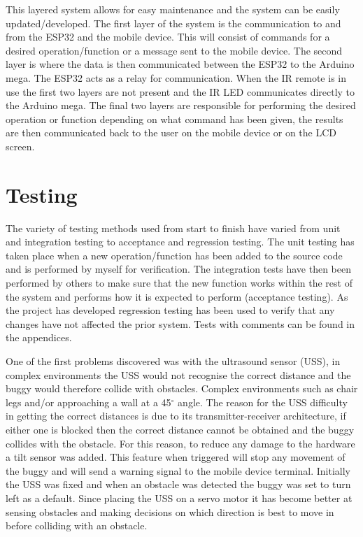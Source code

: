 \documentclass[8pt, a4paper]{article}
\begin{document}
This layered system allows for easy maintenance and the system can be easily updated/developed. The first layer of the system is the communication to and from the ESP32 and the mobile device. This will consist of commands for a desired operation/function or a message sent to the mobile device. The second layer is where the data is then communicated between the ESP32 to the Arduino mega. The ESP32 acts as a relay for communication. When the IR remote is in use the first two layers are not present and the IR LED communicates directly to the Arduino mega. The final two layers are responsible for performing the desired operation or function depending on what command has been given, the results are then communicated back to the user on the mobile device or on the LCD screen.  

\section{Testing}

The variety of testing methods used from start to finish have varied from unit and integration testing to acceptance and regression testing. The unit testing has taken place when a new operation/function has been added to the source code and is performed by myself for verification. The integration tests have then been performed by others to make sure that the new function works within the rest of the system and performs how it is expected to perform (acceptance testing). As the project has developed regression testing has been used to verify that any changes have not affected the prior system. Tests with comments can be found in the appendices.

One of the first problems discovered was with the ultrasound sensor (USS), in complex environments the USS would not recognise the correct distance and the buggy would therefore collide with obstacles. Complex environments such as chair legs and/or approaching a wall at a 45$^{\circ}$ angle. The reason for the USS difficulty in getting the correct distances is due to its transmitter-receiver architecture, if either one is blocked then the correct distance cannot be obtained and the buggy collides with the obstacle. For this reason, to reduce any damage to the hardware a tilt sensor was added. This feature when triggered will stop any movement of the buggy and will send a warning signal to the mobile device terminal. Initially the USS was fixed and when an obstacle was detected the buggy was set to turn left as a default. Since placing the USS on a servo motor it has become better at sensing obstacles and making decisions on which direction is best to move in before colliding with an obstacle. 
\end{document}
